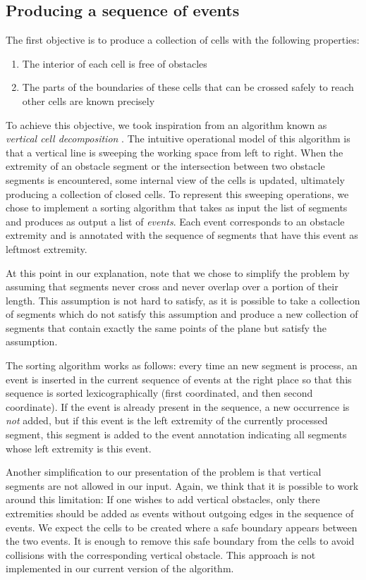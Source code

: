 \documentclass{easychair}
\begin{document}
\subsection{Producing a sequence of events}
The first objective is to produce a collection of cells with the following
properties:
\begin{enumerate}
\item The interior of each cell is free of obstacles
\item The parts of the boundaries of these cells that can be crossed
  safely to reach other cells are known precisely
\end{enumerate}
To achieve this objective, we took inspiration from an algorithm known as
{\em vertical cell decomposition} \cite{Latombe91}.  The intuitive
operational model of this algorithm is that a vertical line is
sweeping the working space from left to right.  When the extremity of
an obstacle segment or the intersection between two obstacle segments
is encountered, some internal view of the cells is updated, ultimately
producing a collection of closed cells.  To represent this sweeping
operations, we chose to implement a sorting algorithm that takes as
input the list of segments and produces as output a list of {\em
  events}.  Each event corresponds to an obstacle extremity and is
annotated with the sequence of segments that have this event as
leftmost extremity.

At this point in our explanation, note that we chose to
simplify the problem by assuming that segments never cross and never
overlap over a portion of their length.  This assumption is not hard
to satisfy, as it is possible to take a collection of segments which
do not satisfy this assumption and produce a new collection of
segments that contain exactly the same points of the plane but satisfy
the assumption.

The sorting algorithm works as follows: every time an new segment is
process, an event is inserted in the current sequence of events at the
right place so that this sequence is sorted lexicographically (first
coordinated, and then second coordinate).  If the event is already
present in the sequence, a new occurrence is {\em not} added, but if
this event is the left extremity of the currently processed
segment, this segment is added to the event annotation indicating all
segments whose left extremity is this event.

Another simplification to our presentation of the problem is that
vertical segments are not allowed in our input.  Again, we think that
it is possible to work around this limitation: If one wishes to add
vertical obstacles, only there extremities should be added as events
without outgoing edges in the sequence of events.  We expect the
cells to be created where a safe boundary appears between the two
events.  It is enough to remove this safe boundary from the cells to
avoid collisions with the corresponding vertical obstacle.  This
approach is not implemented in our current version of the algorithm.
\end{document}
